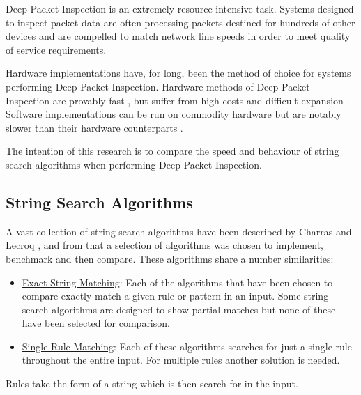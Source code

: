 \documentclass[9pt, conference]{IEEEtran}
\begin{document}
Deep Packet Inspection is an extremely resource intensive task. Systems designed to inspect packet data are often processing packets destined for hundreds of other devices and are compelled to match network line speeds in order to meet quality of service requirements. 

Hardware implementations have, for long, been the method of choice for systems performing Deep Packet Inspection. Hardware methods of Deep Packet Inspection are provably fast \citep{dharmapurikar2003}, but  suffer from high costs and difficult expansion \citep{parsons2012}. Software implementations can be run on commodity hardware but are notably slower than their hardware counterparts \citep{chaudhary2011}.

The intention of this research is to compare the speed and behaviour of string search algorithms when performing Deep Packet Inspection. 

\subsection{String Search Algorithms}

A vast collection of string search algorithms have been described by Charras and Lecroq \citep{charras2004}, and from that a selection of algorithms was chosen to implement, benchmark and then compare. These algorithms share a number similarities:
\begin{itemize}
  \item \underline{Exact String Matching}: Each of the algorithms that have been chosen to compare exactly match a given rule or pattern in an input. Some string search algorithms are designed to show partial matches but none of these have been selected for comparison.
  \item \underline{Single Rule Matching}: Each of these algorithms searches for just a single rule throughout the entire input. For multiple rules another solution is needed.
\end{itemize}

Rules take the form of a string which is then search for in the input.
\end{document}
